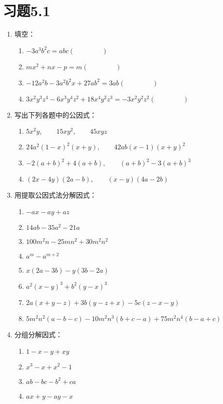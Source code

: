 \section*{习题5.1}
\begin{enumerate}
    \item 填空：
\begin{enumerate}
    \item $-3a^3b^2c=abc(\qquad\qquad )$
    \item $mx^2+nx-p=m(\qquad \qquad)$
    \item $-12a^2b-3a^2b^2x+27ab^2=3ab(\qquad\qquad )$
    \item $3x^2y^3z^4-6x^3y^4z^2+18x^4y^2z^3=-3x^2y^2z^2(\qquad\qquad )$
\end{enumerate}
    \item 写出下列各题中的公因式：
\begin{enumerate}
    \item $5x^2y,\qquad 15xy^2,\qquad 45xyz$
    \item $24a^2(1-x)^2(x+y),\qquad 42ab(x-1)(x+y)^2$
    \item $-2(a+b)^2+4(a+b),\qquad (a+b)^2-3(a+b)^3$
    \item $(2x-4y)(2a-b),\qquad (x-y)(4a-2b)$
\end{enumerate}
    \item 用提取公因式法分解因式：
    \begin{enumerate}
        \item $-ax-ay+az$
        \item $14ab-35a^2-21a$
    \item $100m^2n-25mn^2+30m^2n^2$
    \item $a^m-a^{m+2}$
    \item $x(2a-3b)-y(3b-2a)$
    \item $a^2(x-y)^3+b^2(y-x)^3$
    \item $2a(x+y-z)+3b(y-z+x)-5c(z-x-y)$
    \item $5m^2n^2(a-b-c)-10m^2n^3(b+c-a)+75m^2n^4(b-a+c)$
\end{enumerate}
    \item 分组分解因式：
    \begin{multicols}{2}
    \begin{enumerate}
    \item $1-x-y+xy$
    \item $x^3-x+x^2-1$
    \item $ab-bc-b^2+ca$
    \item $ax+y-ay-x$

\end{enumerate}
\end{multicols}
\end{enumerate}
